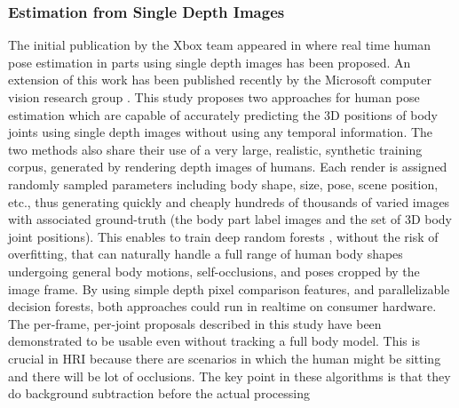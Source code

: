 \subsubsection{Estimation from Single Depth Images}
 The initial publication by the Xbox team \cite{Kinect2014} appeared in \cite{shotton2013real} where real time human pose estimation in parts using single depth images has been proposed. An extension of this work has been published recently by the Microsoft computer vision research group \cite{shotton2013efficient}. This study proposes two approaches for human pose estimation which are capable of accurately predicting the 3D positions of body joints using single depth images without using any temporal information. The two methods also share their use of a very large, realistic, synthetic training corpus, generated by rendering depth images of humans. Each render is assigned randomly sampled parameters including body shape, size, pose, scene position, etc., thus generating quickly and cheaply hundreds of thousands of varied images with associated ground-truth (the body part label images and the set of 3D body joint positions). This enables to train deep random forests \cite{breiman2001random}, without the risk of overfitting, that can naturally handle a full range of human body shapes undergoing general body motions, self-occlusions, and poses cropped by the image frame. By using simple depth pixel comparison features, and parallelizable decision forests, both approaches could run in realtime on consumer hardware. The per-frame, per-joint proposals described in this study have been demonstrated to be usable even without tracking a full body model. This is crucial in HRI because there are scenarios in which the human might be sitting and there will be lot of occlusions. The key point in these algorithms is that they do background subtraction before the actual processing 
